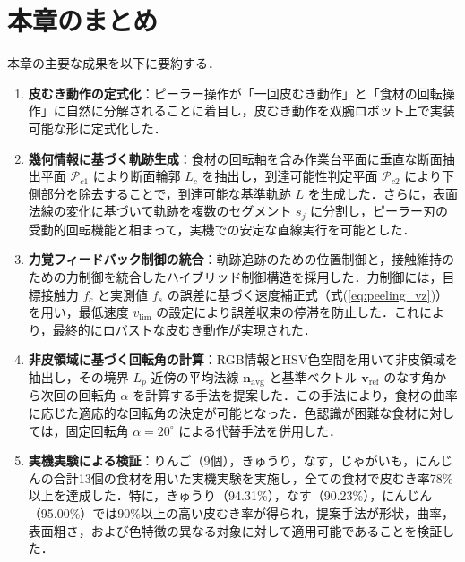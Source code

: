\section{本章のまとめ}
\label{sec:peeling_phase_summary}


本章の主要な成果を以下に要約する．

\begin{enumerate}
  \item \textbf{皮むき動作の定式化}：ピーラー操作が「一回皮むき動作」と「食材の回転操作」に自然に分解されることに着目し，皮むき動作を双腕ロボット上で実装可能な形に定式化した．

  \item \textbf{幾何情報に基づく軌跡生成}：食材の回転軸を含み作業台平面に垂直な断面抽出平面 $\mathcal{P}_{c1}$ により断面輪郭 $L_c$ を抽出し，到達可能性判定平面 $\mathcal{P}_{c2}$ により下側部分を除去することで，到達可能な基準軌跡 $L$ を生成した．さらに，表面法線の変化に基づいて軌跡を複数のセグメント $s_j$ に分割し，ピーラー刃の受動的回転機能と相まって，実機での安定な直線実行を可能とした．

  \item \textbf{力覚フィードバック制御の統合}：軌跡追跡のための位置制御と，接触維持のための力制御を統合したハイブリッド制御構造を採用した．力制御には，目標接触力 $f_c$ と実測値 $f_s$ の誤差に基づく速度補正式（式(\ref{eq:peeling_vz})）を用い，最低速度 $v_{\mathrm{lim}}$ の設定により誤差収束の停滞を防止した．これにより，最終的にロバストな皮むき動作が実現された．

  \item \textbf{非皮領域に基づく回転角の計算}：RGB情報とHSV色空間を用いて非皮領域を抽出し，その境界 $L_p$ 近傍の平均法線 $\mathbf{n}_{\mathrm{avg}}$ と基準ベクトル $\mathbf{v}_{\mathrm{ref}}$ のなす角から次回の回転角 $\alpha$ を計算する手法を提案した．この手法により，食材の曲率に応じた適応的な回転角の決定が可能となった．色認識が困難な食材に対しては，固定回転角 $\alpha = 20^\circ$ による代替手法を併用した．

  \item \textbf{実機実験による検証}：りんご（9個），きゅうり，なす，じゃがいも，にんじんの合計13個の食材を用いた実機実験を実施し，全ての食材で皮むき率78\%以上を達成した．特に，きゅうり（94.31\%），なす（90.23\%），にんじん（95.00\%）では90\%以上の高い皮むき率が得られ，提案手法が形状，曲率，表面粗さ，および色特徴の異なる対象に対して適用可能であることを検証した．
\end{enumerate}

